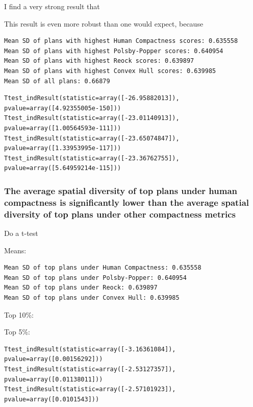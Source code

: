 \documentclass[]{article}
\begin{document}
I find a very strong result that

This result is even more robust than one would expect, because

\begin{verbatim}
Mean SD of plans with highest Human Compactness scores: 0.635558
Mean SD of plans with highest Polsby-Popper scores: 0.640954
Mean SD of plans with highest Reock scores: 0.639897
Mean SD of plans with highest Convex Hull scores: 0.639985
Mean SD of all plans: 0.66879
\end{verbatim}

\begin{verbatim}
Ttest_indResult(statistic=array([-26.95882013]), pvalue=array([4.92355005e-150]))
Ttest_indResult(statistic=array([-23.01140913]), pvalue=array([1.00564593e-111]))
Ttest_indResult(statistic=array([-23.65074847]), pvalue=array([1.33953995e-117]))
Ttest_indResult(statistic=array([-23.36762755]), pvalue=array([5.64959214e-115]))
\end{verbatim}

\hypertarget{the-average-spatial-diversity-of-top-plans-under-human-compactness-is-significantly-lower-than-the-average-spatial-diversity-of-top-plans-under-other-compactness-metrics}{%
\subsubsection{The average spatial diversity of top plans under human
compactness is significantly lower than the average spatial diversity of
top plans under other compactness
metrics}\label{the-average-spatial-diversity-of-top-plans-under-human-compactness-is-significantly-lower-than-the-average-spatial-diversity-of-top-plans-under-other-compactness-metrics}}

Do a t-test

Means:

\begin{verbatim}
Mean SD of top plans under Human Compactness: 0.635558
Mean SD of top plans under Polsby-Popper: 0.640954
Mean SD of top plans under Reock: 0.639897
Mean SD of top plans under Convex Hull: 0.639985
\end{verbatim}

Top 10\%:

Top 5\%:

\begin{verbatim}
Ttest_indResult(statistic=array([-3.16361084]), pvalue=array([0.00156292]))
Ttest_indResult(statistic=array([-2.53127357]), pvalue=array([0.01138011]))
Ttest_indResult(statistic=array([-2.57101923]), pvalue=array([0.0101543]))
\end{verbatim}
\end{document}
